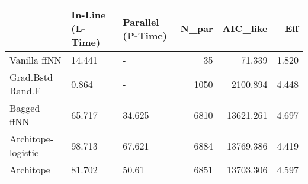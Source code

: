\begin{tabular}{lllrrr}
\toprule
{} & In-Line (L-Time) & Parallel (P-Time) &  N\_par &   AIC\_like &    Eff \\
\midrule
Vanilla ffNN       &           14.441 &                 - &     35 &     71.339 &  1.820 \\
Grad.Bstd Rand.F   &            0.864 &                 - &   1050 &   2100.894 &  4.448 \\
Bagged ffNN        &           65.717 &            34.625 &   6810 &  13621.261 &  4.697 \\
Architope-logistic &           98.713 &            67.621 &   6884 &  13769.386 &  4.419 \\
Architope          &           81.702 &             50.61 &   6851 &  13703.306 &  4.597 \\
\bottomrule
\end{tabular}
